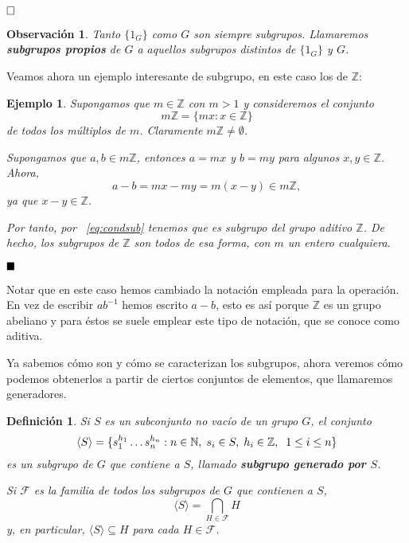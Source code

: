 \documentclass[12pt]{article}
\newtheorem{definition}[theorem]{Definición}
\newtheorem{example}{Ejemplo}[theorem]
\newtheorem{observation}{Observación}[theorem]
\begin{document}
$\hfill \square$

\begin{observation} Tanto $\lbrace 1_{G} \rbrace$ como $G$ son siempre subgrupos. Llamaremos \textbf{subgrupos propios} de $G$ a aquellos subgrupos distintos de $\lbrace 1_{G} \rbrace$ y $G$.
\end{observation}

Veamos ahora un ejemplo interesante de subgrupo, en este caso los de $\mathbb{Z}$:
\begin{example}Supongamos que $m \in \mathbb{Z}$ con $m>1$ y consideremos el conjunto $$m\mathbb{Z}= \lbrace mx : x \in \mathbb{Z}\rbrace $$ de todos los múltiplos de $m$. Claramente $m\mathbb{Z}\neq\emptyset$.


Supongamos que $a,b \in m\mathbb{Z}$, entonces $a=mx$ y $b=my$ para algunos $x,y \in \mathbb{Z}$. Ahora, $$a-b = mx -my = m(x-y) \in m\mathbb{Z},$$ ya que $x-y \in \mathbb{Z}$.


Por tanto, por ~\ref{eq:condsub} tenemos que es subgrupo del grupo aditivo $\mathbb{Z}$. De hecho, los subgrupos de $\mathbb{Z}$ son todos de esa forma, con $m$ un entero cualquiera.
\end{example}
$\hfill \blacksquare$

Notar que en este caso hemos cambiado la notación empleada para la operación. En vez de escribir $ab^{-1}$ hemos escrito $a-b$, esto es así porque $\mathbb{Z}$ es un grupo abeliano y para éstos se suele emplear este tipo de notación, que se conoce como aditiva.

Ya sabemos cómo son y cómo se caracterizan los subgrupos, ahora veremos cómo podemos obtenerlos a partir de ciertos conjuntos de elementos, que llamaremos generadores.

\begin{definition}Si $S$ es un subconjunto no vacío de un grupo $G$, el conjunto $$\langle S \rangle = \lbrace s_{1}^{h_{1}} \ldots s_{n}^{h_{n}} : n \in \mathbb{N},\hspace{0.1cm} s_{i} \in S,\hspace{0.1cm} h_{i} \in \mathbb{Z}, \hspace{0.2cm} 1 \leq i \leq n \rbrace$$ es un subgrupo de $G$ que contiene a $S$, llamado \textbf{subgrupo generado por $S$}.


Si $\mathcal{F}$ es la familia de todos los subgrupos de $G$ que contienen a $S$, $$ \langle S \rangle = \bigcap_{H \in \mathcal{F}} H$$ y, en particular, $\langle S\rangle \subseteq H$ para cada $H \in \mathcal{F}$.
\end{definition}
\end{document}
